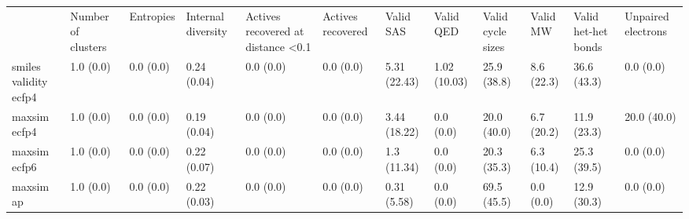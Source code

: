 \begin{tabular}{llllllllllll}
 & Number of clusters & Entropies & Internal diversity & Actives recovered at distance <0.1 & Actives recovered & Valid SAS & Valid QED & Valid cycle sizes & Valid MW & Valid het-het bonds & Unpaired electrons \\
smiles validity ecfp4 & {\cellcolor[HTML]{F6FCFD}} \color[HTML]{000000} 1.0 (0.0) & {\cellcolor[HTML]{F7FCFD}} \color[HTML]{000000} 0.0 (0.0) & {\cellcolor[HTML]{CEEDE8}} \color[HTML]{000000} 0.24 (0.04) & {\cellcolor[HTML]{F7FCFD}} \color[HTML]{000000} 0.0 (0.0) & {\cellcolor[HTML]{F7FCFD}} \color[HTML]{000000} 0.0 (0.0) & {\cellcolor[HTML]{F0F9FB}} \color[HTML]{000000} 5.31 (22.43) & {\cellcolor[HTML]{F6FCFD}} \color[HTML]{000000} 1.02 (10.03) & {\cellcolor[HTML]{C8EBE4}} \color[HTML]{000000} 25.9 (38.8) & {\cellcolor[HTML]{EBF7FA}} \color[HTML]{000000} 8.6 (22.3) & {\cellcolor[HTML]{9DDACB}} \color[HTML]{000000} 36.6 (43.3) & {\cellcolor[HTML]{F7FCFD}} \color[HTML]{000000} 0.0 (0.0) \\
maxsim ecfp4 & {\cellcolor[HTML]{F6FCFD}} \color[HTML]{000000} 1.0 (0.0) & {\cellcolor[HTML]{F7FCFD}} \color[HTML]{000000} 0.0 (0.0) & {\cellcolor[HTML]{D9F1F0}} \color[HTML]{000000} 0.19 (0.04) & {\cellcolor[HTML]{F7FCFD}} \color[HTML]{000000} 0.0 (0.0) & {\cellcolor[HTML]{F7FCFD}} \color[HTML]{000000} 0.0 (0.0) & {\cellcolor[HTML]{F2FAFC}} \color[HTML]{000000} 3.44 (18.22) & {\cellcolor[HTML]{F7FCFD}} \color[HTML]{000000} 0.0 (0.0) & {\cellcolor[HTML]{D6F0EE}} \color[HTML]{000000} 20.0 (40.0) & {\cellcolor[HTML]{EDF8FB}} \color[HTML]{000000} 6.7 (20.2) & {\cellcolor[HTML]{E6F5F9}} \color[HTML]{000000} 11.9 (23.3) & {\cellcolor[HTML]{D6F0EE}} \color[HTML]{000000} 20.0 (40.0) \\
maxsim ecfp6 & {\cellcolor[HTML]{F6FCFD}} \color[HTML]{000000} 1.0 (0.0) & {\cellcolor[HTML]{F7FCFD}} \color[HTML]{000000} 0.0 (0.0) & {\cellcolor[HTML]{D2EEEB}} \color[HTML]{000000} 0.22 (0.07) & {\cellcolor[HTML]{F7FCFD}} \color[HTML]{000000} 0.0 (0.0) & {\cellcolor[HTML]{F7FCFD}} \color[HTML]{000000} 0.0 (0.0) & {\cellcolor[HTML]{F5FBFD}} \color[HTML]{000000} 1.3 (11.34) & {\cellcolor[HTML]{F7FCFD}} \color[HTML]{000000} 0.0 (0.0) & {\cellcolor[HTML]{D5EFED}} \color[HTML]{000000} 20.3 (35.3) & {\cellcolor[HTML]{EEF8FB}} \color[HTML]{000000} 6.3 (10.4) & {\cellcolor[HTML]{CCECE6}} \color[HTML]{000000} 25.3 (39.5) & {\cellcolor[HTML]{F7FCFD}} \color[HTML]{000000} 0.0 (0.0) \\
maxsim ap & {\cellcolor[HTML]{F6FCFD}} \color[HTML]{000000} 1.0 (0.0) & {\cellcolor[HTML]{F7FCFD}} \color[HTML]{000000} 0.0 (0.0) & {\cellcolor[HTML]{D1EEEA}} \color[HTML]{000000} 0.22 (0.03) & {\cellcolor[HTML]{F7FCFD}} \color[HTML]{000000} 0.0 (0.0) & {\cellcolor[HTML]{F7FCFD}} \color[HTML]{000000} 0.0 (0.0) & {\cellcolor[HTML]{F7FCFD}} \color[HTML]{000000} 0.31 (5.58) & {\cellcolor[HTML]{F7FCFD}} \color[HTML]{000000} 0.0 (0.0) & {\cellcolor[HTML]{2F9A59}} \color[HTML]{F1F1F1} 69.5 (45.5) & {\cellcolor[HTML]{F7FCFD}} \color[HTML]{000000} 0.0 (0.0) & {\cellcolor[HTML]{E4F5F8}} \color[HTML]{000000} 12.9 (30.3) & {\cellcolor[HTML]{F7FCFD}} \color[HTML]{000000} 0.0 (0.0) \\

\end{tabular}

